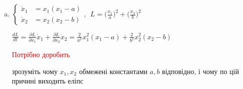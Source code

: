\begin{enumerate}[a)]
{    }

    \item {
        $\left\{\begin{aligned}
            \dot{x}_1 &= x_1(x_1 - a) \\
            \dot{x}_2 &= x_2(x_2 - b)
        \end{aligned}\right.,  \ \ L = \big(\frac{x_1}{a}\big)^2+ \big(\frac{x_2}{b}\big)^2$

        $\frac{dL}{dt} = \frac{\partial L}{\partial x_1}\dot{x}_1 + 
        \frac{\partial L}{\partial x_2} \dot{x}_2 = \frac{2}{a^2}x_1^2(x_1 - a) + \frac{2}{b^2}x_2^2(x_2 - b)$

        \textcolor{red}{Потрібно доробить}

        зрозуміть чому $x_1, x_2$ обмежені константами $a, b$ відповідно, і чому по цій причині виходить еліпс
    }
\end{enumerate}